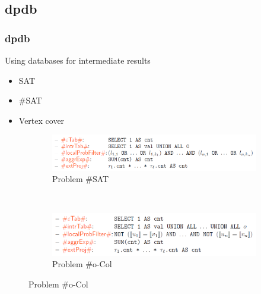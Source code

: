 \documentclass[c,8pt,xcolor...,x11names]{beamer}
\begin{document}
\subsection{dpdb}
\begin{frame}
	\frametitle{dpdb}
	{\color{blue}Using databases for intermediate results} \medskip\\
	\begin{minipage}{0.1\textwidth}
		\hfill
	\end{minipage}
	\begin{minipage}{0.35\textwidth}
		\begin{itemize}
			\item SAT
			\item \#SAT
			\item Vertex cover
		\end{itemize}
	\end{minipage}\hfill
	\begin{minipage}{0.54\textwidth}

		\begin{figure}
			\centering\hfill
			\begin{subfigure}[b]{\textwidth}
				\includegraphics[width=\linewidth]{images/dpdbSSat.png}
				\caption{Problem \#SAT}

			\end{subfigure}\hfill\\
			\begin{subfigure}[b]{\textwidth}
				\includegraphics[width=0.8\linewidth]{images/dpdbOCol.png}
				\caption{Problem \#o-Col}


\end{subfigure}
\end{figure}
\end{minipage}
\end{frame}
\end{document}
